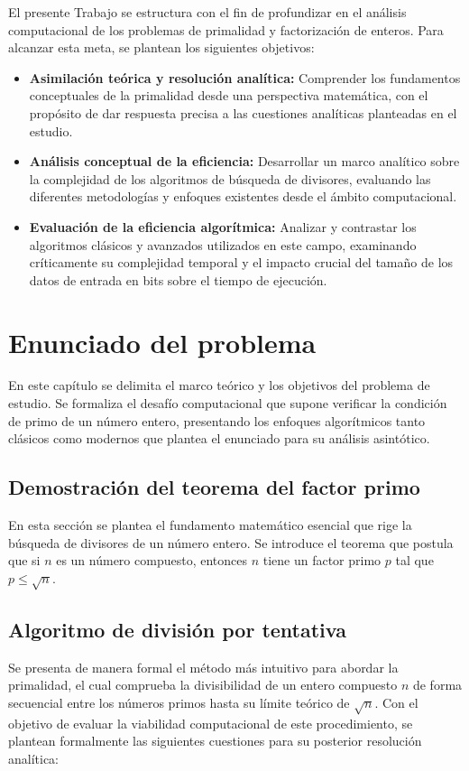 \documentclass[11pt,a4paper,spanish]{book}
\begin{document}
El presente Trabajo se estructura con el fin de profundizar en el análisis computacional de los problemas de primalidad y factorización de enteros. Para alcanzar esta meta, se plantean los siguientes objetivos:

\begin{itemize}
    \item \textbf{Asimilación teórica y resolución analítica:} Comprender los fundamentos conceptuales de la primalidad desde una perspectiva matemática, con el propósito de dar respuesta precisa a las cuestiones analíticas planteadas en el estudio.
    \item \textbf{Análisis conceptual de la eficiencia:} Desarrollar un marco analítico sobre la complejidad de los algoritmos de búsqueda de divisores, evaluando las diferentes metodologías y enfoques existentes desde el ámbito computacional.
    \item \textbf{Evaluación de la eficiencia algorítmica:} Analizar y contrastar los algoritmos clásicos y avanzados utilizados en este campo, examinando críticamente su complejidad temporal y el impacto crucial del tamaño de los datos de entrada en bits sobre el tiempo de ejecución.
\end{itemize}

\chapter{Enunciado del problema}

En este capítulo se delimita el marco teórico y los objetivos del problema de estudio. Se formaliza el desafío computacional que supone verificar la condición de primo de un número entero, presentando los enfoques algorítmicos tanto clásicos como modernos que plantea el enunciado para su análisis asintótico.

\section{Demostración del teorema del factor primo}
En esta sección se plantea el fundamento matemático esencial que rige la búsqueda de divisores de un número entero. Se introduce el teorema que postula que si $n$ es un número compuesto, entonces $n$ tiene un factor primo $p$ tal que $p \leq \sqrt{n}$.

\section{Algoritmo de división por tentativa}
Se presenta de manera formal el método más intuitivo para abordar la primalidad, el cual comprueba la divisibilidad de un entero compuesto $n$ de forma secuencial entre los números primos hasta su límite teórico de $\sqrt{n}$. Con el objetivo de evaluar la viabilidad computacional de este procedimiento, se plantean formalmente las siguientes cuestiones para su posterior resolución analítica:
\end{document}
